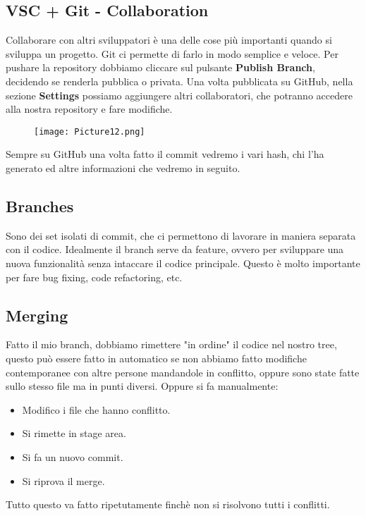 \documentclass[a4paper,12pt]{article}
\begin{document}
\subsection{VSC + Git - Collaboration}
Collaborare con altri sviluppatori è una delle cose più importanti quando si sviluppa un progetto. Git ci permette di farlo in modo semplice e veloce.
Per pushare la repository dobbiamo cliccare sul pulsante \textbf{Publish Branch}, decidendo se renderla pubblica o privata.
Una volta pubblicata su GitHub, nella sezione \textbf{Settings} possiamo aggiungere altri collaboratori, che potranno accedere alla nostra repository e fare modifiche.
\begin{figure}[H]
  \centering
  \texttt{[image: Picture12.png]}
  \label{etichetta12}
\end{figure}
\noindent Sempre su GitHub una volta fatto il commit vedremo i vari hash, chi l'ha generato ed altre informazioni che vedremo in seguito.

\subsection{Branches}
Sono dei set isolati di commit, che ci permettono di lavorare in maniera separata con il codice. Idealmente il branch serve da feature, ovvero per sviluppare una nuova funzionalità senza intaccare il codice principale.
Questo è molto importante per fare bug fixing, code refactoring, etc.

\subsection{Merging}
Fatto il mio branch, dobbiamo rimettere "in ordine" il codice nel nostro tree, questo può essere fatto in automatico se non abbiamo fatto modifiche contemporanee con altre persone mandandole in conflitto, oppure sono state fatte sullo stesso file ma in punti diversi.
\newline Oppure si fa manualmente:
\begin{itemize}
    \item Modifico i file che hanno conflitto.
    \item Si rimette in stage area.
    \item Si fa un nuovo commit.
    \item Si riprova il merge.
\end{itemize}
Tutto questo va fatto ripetutamente finchè non si risolvono tutti i conflitti.
\end{document}

